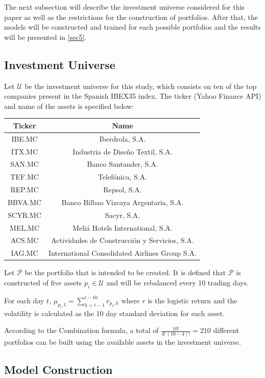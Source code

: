 \documentclass{article}
\newcommand\mat[1]{\mathcal{#1}}
\begin{document}
The next subsection will describe the investment universe considered for this paper as well as the restrictions for the construction of portfolios. After that, the models will be constructed and trained for each possible portfolios and the results will be presented in \ref{sec5}.
\subsection{Investment Universe}
Let $\mat{U}$ be the investment universe for this study, which consists on ten of the top companies present in the Spanish IBEX35 index. The ticker (Yahoo Finance API) and name of the assets is specified below:
\begin{center}
\begin{tabular}{ |c|c|} 
\hline
 \textbf{Ticker} & \textbf{Name}\\ 
 \hline
 IBE.MC & Iberdrola, S.A.\\ 
 \hline
 ITX.MC & Industria de Diseño Textil, S.A.\\
 \hline
 SAN.MC & Banco Santander, S.A.\\
 \hline
 TEF.MC & Telefónica, S.A.\\ 
 \hline
 REP.MC & Repsol, S.A.\\
 \hline
 BBVA.MC & Banco Bilbao Vizcaya Argentaria, S.A. \\
 \hline
 SCYR.MC & Sacyr, S.A. \\
 \hline
 MEL.MC & Meliá Hotels International, S.A. \\
 \hline
 ACS.MC & Actividades de Construcción y Servicios, S.A. \\
 \hline
 IAG.MC & International Consolidated Airlines Group S.A. \\
 \hline
\end{tabular}
\end{center}


Let $\mat{P}$ be the portfolio that is intended to be created. It is defined that $\mat{P}$ is constructed of five assets $p_{i} \in \mat{U}$ and will be rebalanced every 10 trading days.

For each day $t$, $\mu_{p_{i}, t} = \sum_{h=t-1}^{t-10}{r_{p_{i}, h}}$ where $r$ is the logistic return and the volatility is calculated as the 10 day standard deviation for each asset.

According to the Combination formula, a total of $\frac{10!}{4!\,(10-4)!} = 210$ different portfolios can be built using the available assets in the investment universe.

\subsection{Model Construction}
\end{document}
